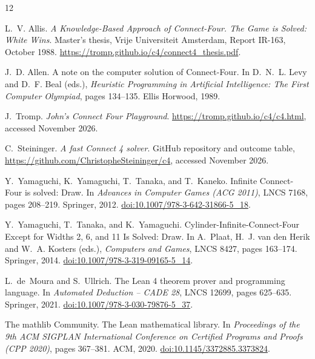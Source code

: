\documentclass[11pt,a4paper]{article}
\theoremstyle{plain}
\theoremstyle{definition}
\begin{document}
\begin{thebibliography}{12}
\small
\setlength{\itemsep}{3pt}

L.~V. Allis.
\newblock \emph{A Knowledge-Based Approach of Connect-Four. The Game is Solved: White Wins}.
\newblock Master's thesis, Vrije Universiteit Amsterdam, Report IR-163, October 1988.
\newblock \url{https://tromp.github.io/c4/connect4_thesis.pdf}.

J.~D. Allen.
\newblock A note on the computer solution of Connect-Four.
\newblock In D.~N.~L. Levy and D.~F. Beal (eds.), \emph{Heuristic Programming in Artificial Intelligence: The First Computer Olympiad}, pages 134--135. Ellis Horwood, 1989.

J.~Tromp.
\newblock \emph{John's Connect Four Playground}.
\newblock \url{https://tromp.github.io/c4/c4.html}, accessed November 2026.

C.~Steininger.
\newblock \emph{A fast Connect 4 solver}.
\newblock GitHub repository and outcome table, \url{https://github.com/ChristopheSteininger/c4}, accessed November 2026.

Y.~Yamaguchi, K.~Yamaguchi, T.~Tanaka, and T.~Kaneko.
\newblock Infinite Connect-Four is solved: Draw.
\newblock In \emph{Advances in Computer Games (ACG 2011)}, LNCS 7168, pages 208--219. Springer, 2012.
\newblock \href{https://doi.org/10.1007/978-3-642-31866-5_18}{doi:10.1007/978-3-642-31866-5\_18}.

Y.~Yamaguchi, T.~Tanaka, and K.~Yamaguchi.
\newblock Cylinder-Infinite-Connect-Four Except for Widths 2, 6, and 11 Is Solved: Draw.
\newblock In A.~Plaat, H.~J. van den Herik and W.~A. Kosters (eds.), \emph{Computers and Games}, LNCS 8427, pages 163--174. Springer, 2014.
\newblock \href{https://doi.org/10.1007/978-3-319-09165-5_14}{doi:10.1007/978-3-319-09165-5\_14}.

L.~de~Moura and S.~Ullrich.
\newblock The Lean 4 theorem prover and programming language.
\newblock In \emph{Automated Deduction -- CADE 28}, LNCS 12699, pages 625--635. Springer, 2021.
\newblock \href{https://doi.org/10.1007/978-3-030-79876-5_37}{doi:10.1007/978-3-030-79876-5\_37}.

The mathlib Community.
\newblock The Lean mathematical library.
\newblock In \emph{Proceedings of the 9th ACM SIGPLAN International Conference on Certified Programs and Proofs (CPP 2020)}, pages 367--381. ACM, 2020.
\newblock \href{https://doi.org/10.1145/3372885.3373824}{doi:10.1145/3372885.3373824}.


\end{thebibliography}
\end{document}
